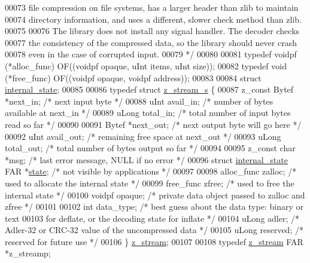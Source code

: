 \begin{DoxyCode}
00073 \textcolor{comment}{  file compression on file systems, has a larger header than zlib to maintain}
00074 \textcolor{comment}{  directory information, and uses a different, slower check method than zlib.}
00075 \textcolor{comment}{}
00076 \textcolor{comment}{    The library does not install any signal handler.  The decoder checks}
00077 \textcolor{comment}{  the consistency of the compressed data, so the library should never crash}
00078 \textcolor{comment}{  even in the case of corrupted input.}
00079 \textcolor{comment}{*/}
00080 
00081 \textcolor{keyword}{typedef} voidpf (*alloc\_func) OF((voidpf opaque, uInt items, uInt size));
00082 \textcolor{keyword}{typedef} void   (*free\_func)  OF((voidpf opaque, voidpf address));
00083 
00084 \textcolor{keyword}{struct }\hyperlink{structinternal__state}{internal\_state};
00085 
00086 \textcolor{keyword}{typedef} \textcolor{keyword}{struct }\hyperlink{structz__stream__s}{z\_stream\_s} \{
00087     z\_const Bytef *next\_in;     \textcolor{comment}{/* next input byte */}
00088     uInt     avail\_in;  \textcolor{comment}{/* number of bytes available at next\_in */}
00089     uLong    total\_in;  \textcolor{comment}{/* total number of input bytes read so far */}
00090 
00091     Bytef    *next\_out; \textcolor{comment}{/* next output byte will go here */}
00092     uInt     avail\_out; \textcolor{comment}{/* remaining free space at next\_out */}
00093     uLong    total\_out; \textcolor{comment}{/* total number of bytes output so far */}
00094 
00095     z\_const \textcolor{keywordtype}{char} *msg;  \textcolor{comment}{/* last error message, NULL if no error */}
00096     \textcolor{keyword}{struct }\hyperlink{structinternal__state}{internal\_state} FAR *\hyperlink{structstate}{state}; \textcolor{comment}{/* not visible by applications */}
00097 
00098     alloc\_func zalloc;  \textcolor{comment}{/* used to allocate the internal state */}
00099     free\_func  zfree;   \textcolor{comment}{/* used to free the internal state */}
00100     voidpf     opaque;  \textcolor{comment}{/* private data object passed to zalloc and zfree */}
00101 
00102     \textcolor{keywordtype}{int}     data\_type;  \textcolor{comment}{/* best guess about the data type: binary or text}
00103 \textcolor{comment}{                           for deflate, or the decoding state for inflate */}
00104     uLong   adler;      \textcolor{comment}{/* Adler-32 or CRC-32 value of the uncompressed data */}
00105     uLong   reserved;   \textcolor{comment}{/* reserved for future use */}
00106 \} \hyperlink{structz__stream__s}{z\_stream};
00107 
00108 \textcolor{keyword}{typedef} \hyperlink{structz__stream__s}{z\_stream} FAR *z\_streamp;

\end{DoxyCode}
